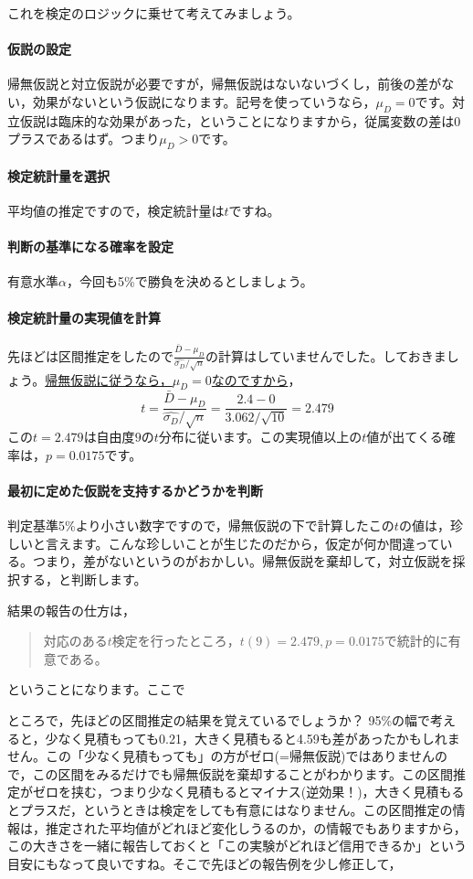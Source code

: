 \documentclass{ltjsarticle}
\begin{document}
これを検定のロジックに乗せて考えてみましょう。
\paragraph{仮説の設定}帰無仮説と対立仮説が必要ですが，帰無仮説はないないづくし，前後の差がない，効果がないという仮説になります。記号を使っていうなら，$\mu_D=0$です。対立仮説は臨床的な効果があった，ということになりますから，従属変数の差は0プラスであるはず。つまり$\mu_D > 0$です。
\paragraph{検定統計量を選択}平均値の推定ですので，検定統計量は$t$ですね。
\paragraph{判断の基準になる確率を設定}有意水準$\alpha$，今回も5\%で勝負を決めるとしましょう。
\paragraph{検定統計量の実現値を計算}先ほどは区間推定をしたので$\frac{\bar{D}-\mu_D}{\hat{\sigma_D}/\sqrt{n}} $の計算はしていませんでした。しておきましょう。\underline{帰無仮説に従うなら，$\mu_D=0$なのですから}，
\[t= \frac{\bar{D}-\mu_D}{\hat{\sigma_D}/\sqrt{n}}  = \frac{2.4-0}{3.062/\sqrt{10}}  = 2.479\]
この$t = 2.479$は自由度$9$の$t$分布に従います。この実現値以上の$t$値が出てくる確率は，$p=0.0175$です。
\paragraph{最初に定めた仮説を支持するかどうかを判断}
判定基準5\%より小さい数字ですので，帰無仮説の下で計算したこの$t$の値は，珍しいと言えます。こんな珍しいことが生じたのだから，仮定が何か間違っている。つまり，差がないというのがおかしい。帰無仮説を棄却して，対立仮説を採択する，と判断します。

結果の報告の仕方は，
\begin{quote}
	対応のある$t$検定を行ったところ，$t(9)=2.479,p=0.0175$で統計的に有意である。
\end{quote}
ということになります。ここで

ところで，先ほどの区間推定の結果を覚えているでしょうか？ 95\%の幅で考えると，少なく見積もっても0.21，大きく見積もると4.59も差があったかもしれません。この「少なく見積もっても」の方がゼロ(=帰無仮説)ではありませんので，この区間をみるだけでも帰無仮説を棄却することがわかります。この区間推定がゼロを挟む，つまり少なく見積もるとマイナス(逆効果！)，大きく見積もるとプラスだ，というときは検定をしても有意にはなりません。この区間推定の情報は，推定された平均値がどれほど変化しうるのか，の情報でもありますから，この大きさを一緒に報告しておくと「この実験がどれほど信用できるか」という目安にもなって良いですね。そこで先ほどの報告例を少し修正して，
\end{document}
